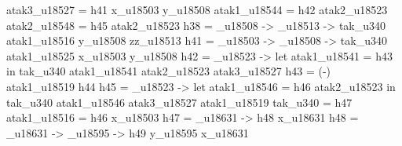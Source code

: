                                                                                                                         atak3_u18527 = h41 x_u18503 y_u18508
                                                                                                                        atak1_u18544 = h42 atak2_u18523
                                                                                                                        atak2_u18548 = h45 atak2_u18523
                                                                                                                        h38 = \y_u18508 -> \zz_u18513 -> tak_u340 atak1_u18516 y_u18508 zz_u18513
                                                                                                                        h41 = \x_u18503 -> \y_u18508 -> tak_u340 atak1_u18525 x_u18503 y_u18508
                                                                                                                        h42 = _u18523 -> let
                                                                                                                                                 atak1_u18541 = h43
                                                                                                                                               in tak_u340 atak1_u18541 atak2_u18523 atak3_u18527
                                                                                                                        h43 = (-) atak1_u18519 h44
                                                                                                                        h45 = _u18523 -> let
                                                                                                                                                 atak1_u18546 = h46 atak2_u18523
                                                                                                                                               in tak_u340 atak1_u18546 atak3_u18527 atak1_u18519
                                                                                                                        tak_u340 = h47
                                                                                                                        atak1_u18516 = h46 x_u18503
                                                                                                                        h47 = \x_u18631 -> h48 x_u18631
                                                                                                                        h48 = \x_u18631 -> \y_u18595 -> h49 y_u18595 x_u18631

